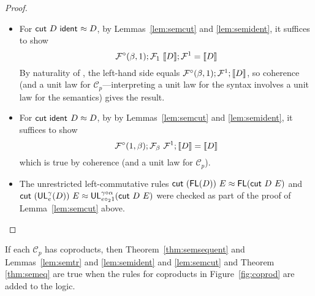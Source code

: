 \documentclass{drl-common/llncs}
\renewcommand{\sem}[1]{\ensuremath{ \llbracket #1 \rrbracket}}
\newcommand{\C}{\ensuremath{\mathcal{C}}}
\newcommand\compo[2]{\ensuremath{#1 \circ #2}}
\newcommand\comph[2]{\ensuremath{#1 \mathbin{\circ_2} #2}}
\newcommand\ident[1]{\ensuremath{\dsd{ident}_{#1}}}
\newcommand\cutsym{\ensuremath{\dsd{cut}}}
\newcommand\cut[2]{\ensuremath{{\cutsym \,\, #1 \,\, #2}}}
\newcommand\UL[3]{\ensuremath{\dsd{UL}^{#1}_{#2}(#3)}}
\newcommand\FL[1]{\ensuremath{\dsd{FL}(#1)}}
\newcommand\ap[2]{\ensuremath{#1 \approx #2}}
\begin{document}
\begin{proof}
\begin{itemize}
\item For  
{\ap{\cut{D}{\ident{}}}{D}},
by Lemmas~\ref{lem:semcut} and \ref{lem:semident}, 
it suffices to show 
\[
\semFcomp(\beta,1);\semF{1}{\sem{D}};\semFone = \sem{D}
\]
By naturality of \semFone, the left-hand side equals
$\semFcomp(\beta,1);\semFone;\sem{D}$, so coherence (and a unit law for
$\C_p$---interpreting a unit law for the syntax involves a unit law for
the semantics) gives the result.

\item For {\ap{\cut{\ident{}}{D}}{D}}, by 
by Lemmas~\ref{lem:semcut} and \ref{lem:semident}, 
it suffices to show 
\[
\semFcomp(1,\beta);\semF{\beta}{\semFone};{\sem{D}} = \sem{D}
\]
which is true by coherence (and a unit law for $\C_p$).

\item The unrestricted left-commutative rules ${\ap{\cut {(\FL D)} E} {\FL {\cut D E}}}$
and\\ ${\ap{\cut {(\UL \gamma e D)} E} {\UL {\compo{\gamma}{\alpha}}
    {\comph{e}{1}} {\cut D E}}}$ were checked as part of the proof of
Lemma~\ref{lem:semcut} above.   
\end{itemize}
\end{proof}

\begin{lemma}
If each $\C_p$ has coproducts, then
Theorem~\ref{thm:semsequent} and Lemmas~\ref{lem:semtr} and
\ref{lem:semident} and \ref{lem:semcut} and Theorem \ref{thm:semeq} are
true when the rules for coproducts in Figure~\ref{fig:coprod} are added
to the logic.  
\end{lemma}
\end{document}
